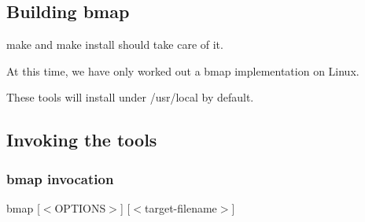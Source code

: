 \documentclass[letterpaper]{article}
\begin{document}
\subsection{Building bmap }

{\ttfamily make} and {\ttfamily make install} should take care of it.

At this time, we have only worked out a bmap implementation on Linux.

These tools will install under {\ttfamily /usr/local} by default.




\subsection{Invoking the tools}


\subsubsection{{\ttfamily bmap} invocation}

{\ttfamily bmap [$<$OPTIONS$>$] [$<$target-filename$>$]}
\end{document}
